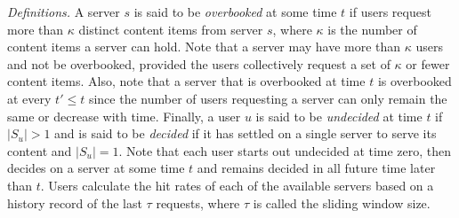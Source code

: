 \documentclass[conference]{IEEEtran}
\begin{document}
{\em Definitions.} A server $s$  is said to be {\em overbooked} at some time $t$ if users request more than $\kappa$ distinct content items from server $s$, where $\kappa$ is the number of content items a server can hold. Note that a server may have more than $\kappa$ users and not be overbooked, provided the users collectively request a set of $\kappa$ or fewer content items. Also, note that a server that is overbooked at time $t$ is overbooked at every $t' \leq t$ since the number of users requesting  a server can only remain the same or decrease with time. Finally, a user $u$ is said to be {\em undecided} at time  $t$ if   $|S_u| > 1$ and is said to be {\em decided} if it has settled on a single server to serve its content and $|S_u| = 1$. Note that each user starts out undecided at  time zero, then decides on a server at some time  $t$ and remains decided in all future time later than $t$. Users calculate the hit rates of each of the available servers based on a history record of the last $\tau$ requests, where $\tau$ is called the sliding window size. 
\end{document}
